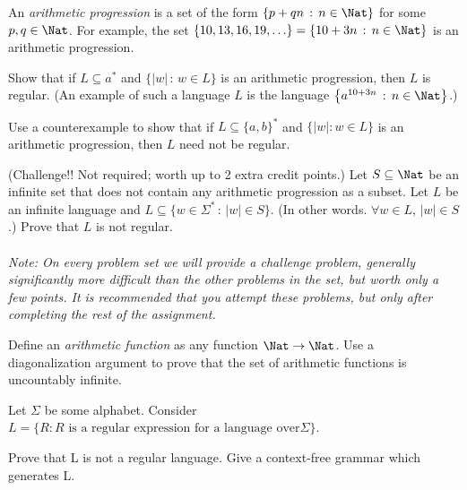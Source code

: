 \documentclass[solution, letterpaper]{cscie121}
\begin{document}
An \emph{arithmetic progression} is a set of the form $\{p+qn \,:\, n \in \Nat\}$ for some $p,q \in \Nat$. For example, the set $\{10,13,16,19,\ldots\} = \{10+3n \,:\, n \in \Nat\}$ is an arithmetic progression.

\subproblem  Show that if $L \subseteq a^*$ and $\{|w| \,:\, w \in L\}$ is an arithmetic progression, then $L$ is regular. (An example of such a language $L$ is the language $\left\{a^{10+3n} \,:\, n \in \Nat\right\}$.)

\subproblem Use a counterexample to show that if $L \subseteq \{a,b\}^*$ and $\{|w| : w \in L\}$ is an arithmetic progression, then $L$ need not be regular.

\subproblem (Challenge!! Not required; worth up to 2 extra credit points.) Let $S \subseteq \Nat$ be an infinite set that does not contain any arithmetic progression as a subset. Let $L$ be an infinite language and $L \subseteq \{w \in \Sigma^* \,:\, |w| \in S\}$. (In other words. $\forall w \in L$, $|w| \in S$.) Prove that $L$ is not regular.\\\\
\textit{Note: On every problem set we will provide a challenge problem, generally significantly more difficult than the other problems in the set, but worth only a few points. It is recommended that you attempt these problems, but only after completing the rest of the assignment.}

\begin{solution}
\end{solution}





Define an \emph{arithmetic function} as any function $\Nat \to \Nat$. Use a diagonalization argument to prove that the set of arithmetic functions is uncountably infinite.

\begin{solution}
\end{solution}



Let $\Sigma$ be some alphabet. Consider $L = \{ R : R \text{ is a regular expression for a language over} \Sigma \}$. 

\subproblem Prove that L is not a regular language. 
\subproblem Give a context-free grammar which generates L. 
 
\begin{solution}
\end{solution}
\end{document}
